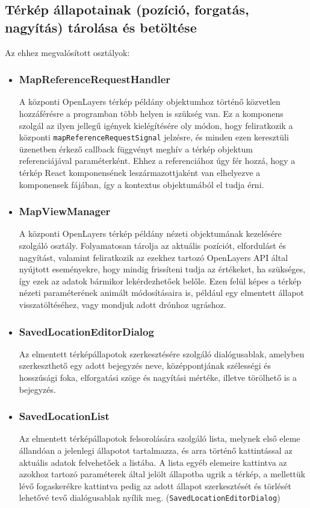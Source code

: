 \subsection{Térkép állapotainak (pozíció, forgatás, nagyítás) tárolása és betöltése}

\noindent Az ehhez megvalósított osztályok:
\begin{itemize}

\item\subsubsection{MapReferenceRequestHandler}
A központi OpenLayers térkép példány objektumhoz történő közvetlen hozzáférésre
a programban több helyen is szükség van. Ez a komponens szolgál az ilyen jellegű
igények kielégítésére oly módon, hogy feliratkozik a központi
\verb|mapReferenceRequestSignal| jelzésre, és minden ezen keresztüli üzenetben
érkező callback függvényt meghív a térkép objektum referenciájával
paraméterként. Ehhez a referenciához úgy fér hozzá, hogy a térkép React
komponensének leszármazottjaként van elhelyezve a komponensek fájában, így a
kontextus objektumából el tudja érni.

\item\subsubsection{MapViewManager}
A központi OpenLayers térkép példány nézeti objektumának kezelésére szolgáló
osztály. Folyamatosan tárolja az aktuális pozíciót, elfordulást és nagyítást,
valamint feliratkozik az ezekhez tartozó OpenLayers API által nyújtott
eseményekre, hogy mindig frissíteni tudja az értékeket, ha szükséges, így ezek
az adatok bármikor lekérdezhetőek belőle. Ezen felül képes a térkép nézeti
paraméterének animált módosításaira is, például egy elmentett állapot
visszatöltéséhez, vagy mondjuk adott drónhoz ugráshoz.

\item\subsubsection{SavedLocationEditorDialog}
Az elmentett térképállapotok szerkesztésére szolgáló dialógusablak, amelyben
szerkeszthető egy adott bejegyzés neve, középpontjának szélességi és hosszúsági
foka, elforgatási szöge és nagyítási mértéke, illetve törölhető is a bejegyzés.

\item\subsubsection{SavedLocationList}
Az elmentett térképállapotok felsorolására szolgáló lista, melynek első eleme
állandóan a jelenlegi állapotot tartalmazza, és arra történő kattintással az
aktuális adatok felvehetőek a listába. A lista egyéb elemeire kattintva az
azokhoz tartozó paraméterek által jelölt állapotba ugrik a térkép, a mellettük
lévő fogaskerékre kattintva pedig az adott állapot szerkesztését és törlését
lehetővé tevő dialógusablak nyílik meg. (\verb|SavedLocationEditorDialog|)

\end{itemize}
